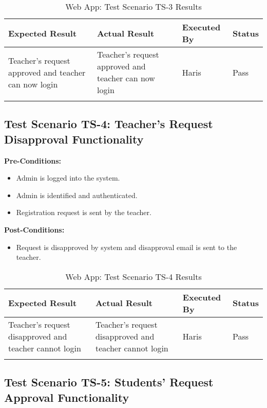 \bigskip

\begin{longtable}{|p{4cm}|p{4cm}|p{2cm}|p{2cm}|}
\hline
\textbf{Expected Result} & \textbf{Actual Result} & \textbf{Executed By} & \textbf{Status}\\
\hline
Teacher's request approved and teacher can now login &
Teacher's request approved and teacher can now login &
Haris &
Pass \\
\hline

\caption{Web App: Test Scenario TS-3 Results}
\end{longtable}



\subsection{Test Scenario TS-4: Teacher's Request Disapproval Functionality}

\textbf{Pre-Conditions: }
\begin{itemize}

\item Admin is logged into the system.
\item Admin is identified and authenticated.
\item Registration request is sent by the teacher.

\end{itemize}
\textbf{Post-Conditions: } 
\begin{itemize}
\item Request is disapproved by system and disapproval email is sent to the teacher.
\end{itemize} 

\bigskip
\newpage
\begin{longtable}{|p{4cm}|p{4cm}|p{2cm}|p{2cm}|}
\hline
\textbf{Expected Result} & \textbf{Actual Result} & \textbf{Executed By} & \textbf{Status}\\
\hline
Teacher's request disapproved and teacher cannot login &
Teacher's request disapproved and teacher cannot login &
Haris &
Pass \\
\hline

\caption{Web App: Test Scenario TS-4 Results}
\end{longtable}



\subsection{Test Scenario TS-5: Students' Request Approval Functionality}

